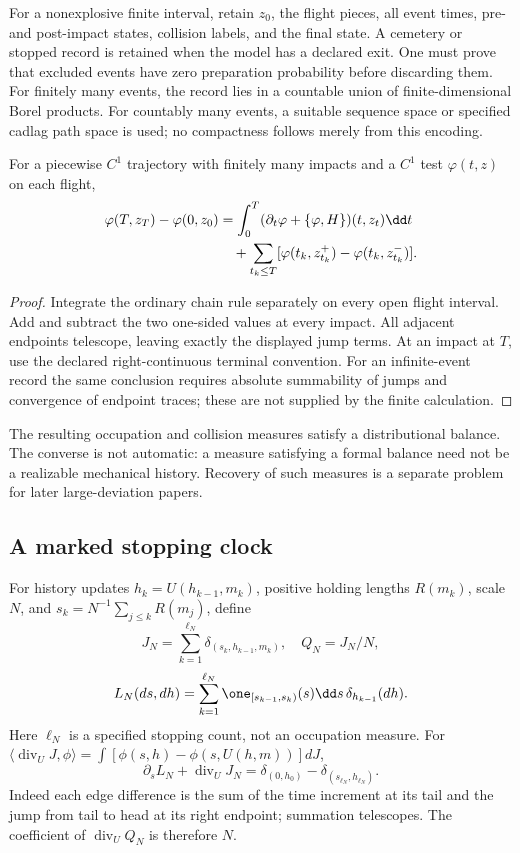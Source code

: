 For a nonexplosive finite interval, retain $z_0$, the flight pieces, all event times, pre- and post-impact states, collision labels, and the final state. A cemetery or stopped record is retained when the model has a declared exit. One must prove that excluded events have zero preparation probability before discarding them. For finitely many events, the record lies in a countable union of finite-dimensional Borel products. For countably many events, a suitable sequence space or specified cadlag path space is used; no compactness follows merely from this encoding.

\begin{proposition}\label{prop:balance}
For a piecewise $C^1$ trajectory with finitely many impacts and a $C^1$ test $\varphi(t,z)$ on each flight,
\begin{align}
 \varphi(T,z_T)-\varphi(0,z_0)
 &=\int_0^T(\partial_t\varphi+\{\varphi,H\})(t,z_t)\dd t\notag\\
 &\quad+\sum_{t_k\le T}[\varphi(t_k,z_{t_k}^+)-\varphi(t_k,z_{t_k}^-)].
 \label{eq:path-balance}
\end{align}
\end{proposition}
\begin{proof}
Integrate the ordinary chain rule separately on every open flight interval. Add and subtract the two one-sided values at every impact. All adjacent endpoints telescope, leaving exactly the displayed jump terms. At an impact at $T$, use the declared right-continuous terminal convention. For an infinite-event record the same conclusion requires absolute summability of jumps and convergence of endpoint traces; these are not supplied by the finite calculation.
\end{proof}

The resulting occupation and collision measures satisfy a distributional balance. The converse is not automatic: a measure satisfying a formal balance need not be a realizable mechanical history. Recovery of such measures is a separate problem for later large-deviation papers.

\subsection{A marked stopping clock}
For history updates $h_k=U(h_{k-1},m_k)$, positive holding lengths $R(m_k)$, scale $N$, and $s_k=N^{-1}\sum_{j\le k}R(m_j)$, define
\[
 J_N=\sum_{k=1}^{\ell_N}\delta_{(s_k,h_{k-1},m_k)},\quad Q_N=J_N/N,
\]
\[
 L_N(ds,dh)=\sum_{k=1}^{\ell_N}\one_{[s_{k-1},s_k)}(s)\dd s\,\delta_{h_{k-1}}(dh).
\]
Here $\ell_N$ is a specified stopping count, not an occupation measure. For
$\langle\operatorname{div}_UJ,\phi\rangle=\int[\phi(s,h)-\phi(s,U(h,m))]dJ$,
\begin{equation}
 \partial_sL_N+\operatorname{div}_UJ_N
 =\delta_{(0,h_0)}-\delta_{(s_{\ell_N},h_{\ell_N})}.
 \label{eq:clock-balance}
\end{equation}
Indeed each edge difference is the sum of the time increment at its tail and the jump from tail to head at its right endpoint; summation telescopes. The coefficient of $\operatorname{div}_UQ_N$ is therefore $N$.

